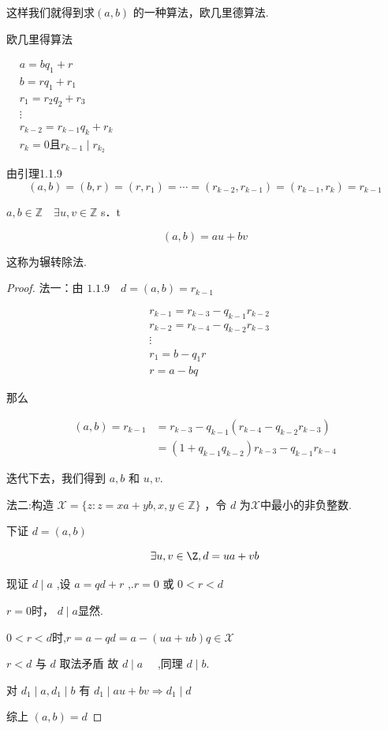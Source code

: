 这样我们就得到求$(a, b)$  的一种算法，欧几里德算法.


\begin{algo}欧几里得算法
	
	$\begin{aligned}
		& a=b q_1+r \\
		& b=r q_1+r_1 \\
		& r_1=r_2 q_2+r_3 \\
		& \vdots \\
		& r_{k-2}=r_{k-1} q_k+r_k\\
		&r_k=0\textbf{且}r_{k-1}\mid r_{k_2}
	\end{aligned}$
	
	由引理1.1.9
	$$(a, b)=(b, r)=\left(r, r_1\right)=\cdots=\left(r_{k-2}, r_{k-1}\right)=\left(r_{k-1}, r_k\right)=r_{k-1}$$
\end{algo}
\begin{definition}
	$a, b \in \mathbb{Z} \quad \exists u, v \in \mathbb{Z}$ s．t
	
	$$
	(a, b)=a u+b v
	$$
	
	
	
\end{definition}
\label{p1:concept:c1-l333}这称为辗转除法.
\begin{proof}
	法一：由 $1.1.9 \quad d=(a, b)=r_{k-1}$
	
	$$
	\begin{aligned}
		& r_{k-1}=r_{k-3}-q_{k-1} r_{k-2} \\
		& r_{k-2}=r_{k-4}-q_{k-2} r_{k-3}\\
		&\vdots\\
		& r_1=b-q_1 r \\
		& r=a-b q
	\end{aligned}
	$$
	
	
	那么
	
	$$
	\begin{aligned}
		(a, b)=r_{k-1} & =r_{k-3}-q_{k-1}\left(r_{k-4}-q_{k-2} r_{k-3}\right) \\
		& =\left(1+q_{k-1} q_{k-2}\right) r_{k-3}-q_{k-1} r_{k-4}
	\end{aligned}
	$$
	
	
	迭代下去，我们得到 $a, b$ 和 $u, v$.
	
	法二:构造 $\mathcal{X}=\{z: z=x a+y b,  x,  y \in \mathbb{Z}\}$ ，令 $d$ 为$\mathcal{X}$中最小的非负整数.
	
	下证 $d=(a, b)$
	
	$$\exists u,v\in\Z,
	d=u a+v b
	$$
	
	
	现证 $d \mid a$ ,设 $a=q d+r $ ,.$ r=0$ 或 $0<r<d $
	
	$r=0$时， $d\mid a$显然.
	
	
	$0<r<d \textbf{时,} r=a-q d=a-(u a+u b) q \in \mathcal{X}$
	
	$r<d$ 与 $d$ 取法矛盾 故 $d \mid a \quad$ ,同理 $d \mid b$.
	
	对 $d_1\mid a, d_1\mid b$ 有 $d_1\mid a u+b v \Rightarrow d_1\mid d$
	
	综上 $(a, b)=d$
\end{proof}

